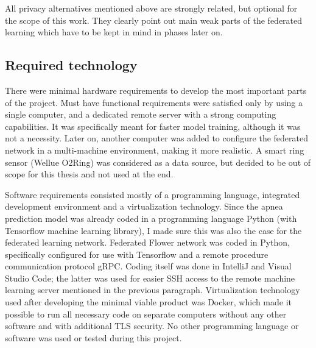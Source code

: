 All privacy alternatives mentioned above are strongly related, but optional for the scope of this work. They clearly point out main weak parts of the federated learning which have to be kept in mind in phases later on.


\subsection{Required technology}


There were minimal hardware requirements to develop the most important parts of the project. Must have functional requirements were satisfied only by using a single computer, and a dedicated remote server with a strong computing capabilities. It was specifically meant for faster model training, although it was not a necessity. Later on, another computer was added to configure the federated network in a multi-machine environment, making it more realistic. A smart ring sensor (Wellue O2Ring) was considered as a data source, but decided to be out of scope for this thesis and not used at the end.

Software requirements consisted mostly of a programming language, integrated development environment and a virtualization technology. Since the apnea prediction model was already coded in a programming language Python (with Tensorflow machine learning library), I made sure this was also the case for the federated learning network. Federated Flower network was coded in Python, specifically configured for use with Tensorflow and a remote procedure communication protocol gRPC. Coding itself was done in IntelliJ and Visual Studio Code; the latter was used for easier SSH access to the remote machine learning server mentioned in the previous paragraph. Virtualization technology used after developing the minimal viable product was Docker, which made it possible to run all necessary code on separate computers without any other software and with additional TLS security. No other programming language or software was used or tested during this project.



